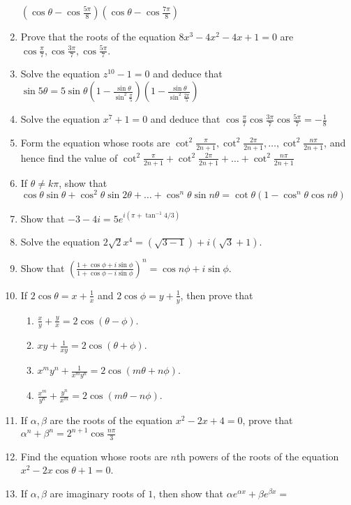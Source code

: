 \begin{enumerate}[resume]
  $\left(\cos\theta - \cos\frac{5\pi}{8}\right)\left(\cos\theta - \cos\frac{7\pi}{8}\right)$
\item Prove that the roots of the equation $8x^3 - 4x^2 - 4x + 1= 0$ are $\cos\frac{\pi}{7}, \cos\frac{3\pi}{7},
  \cos\frac{5\pi}{7}$.
\item Solve the equation $z^{10} - 1 = 0$ and deduce that $\sin5\theta = 5\sin\theta\left(1 -
  \frac{\sin\theta}{\sin^2\frac{\pi}{5}}\right)\left(1 - \frac{\sin\theta}{\sin^2\frac{2\pi}{5}}\right)$
\item Solve the equation $x^7 +1 = 0$ and deduce that $\cos\frac{\pi}{7}\cos\frac{3\pi}{7}\cos\frac{5\pi}{7} = -\frac{1}{8}$
\item Form the equation whose roots are $\cot^2\frac{\pi}{2n + 1}, \cot^2\frac{2\pi}{2n + 1}, \ldots, \cot^2\frac{n\pi}{2n + 1}$,
  and hence find the value of $\cot^2\frac{\pi}{2n + 1} + \cot^2\frac{2\pi}{2n + 1} + \ldots + \cot^2\frac{n\pi}{2n + 1}$
\item If $\theta \neq k\pi$, show that $\cos\theta\sin\theta + \cos^2\theta\sin2\theta + \ldots + \cos^n\theta\sin n\theta =
  \cot\theta(1 - \cos^n\theta\cos n\theta)$
\item Show that $-3 - 4i = 5e^{i(\pi + \tan^{-1}4/3)}$
\item Solve the equation $2\sqrt{2}x^4 = (\sqrt{3 - 1}) + i(\sqrt{3} + 1)$.
\item Show that $\left(\frac{1 + \cos\phi + i\sin\phi}{1 + \cos\phi - i\sin\phi}\right)^n = \cos n\phi + i\sin\phi$.
\item If $2\cos\theta = x + \frac{1}{x}$ and $2\cos\phi = y + \frac{1}{y}$, then prove that
  \begin{enumerate}
  \item $\frac{x}{y} + \frac{y}{x} = 2\cos(\theta - \phi)$.
  \item $xy + \frac{1}{xy} = 2\cos(\theta + \phi)$.
  \item $x^my^n + \frac{1}{x^my^n} = 2\cos(m\theta + n\phi)$.
  \item $\frac{x^m}{y^n} + \frac{y^n}{x^m} = 2\cos(m\theta - n\phi)$.
  \end{enumerate}
\item If $\alpha, \beta$ are the roots of the equation $x^2 - 2x + 4 = 0$, prove that $\alpha^n + \beta^n = 2^{n +
  1}\cos\frac{n\pi}{3}$
\item Find the equation whose roots are $n$th powers of the roots of the equation $x^2 - 2x\cos\theta + 1 = 0$.
\item If $\alpha, \beta$ are imaginary roots of $1$, then show that $\alpha e^{\alpha x} + \beta e^{\beta x} =$


\end{enumerate}
